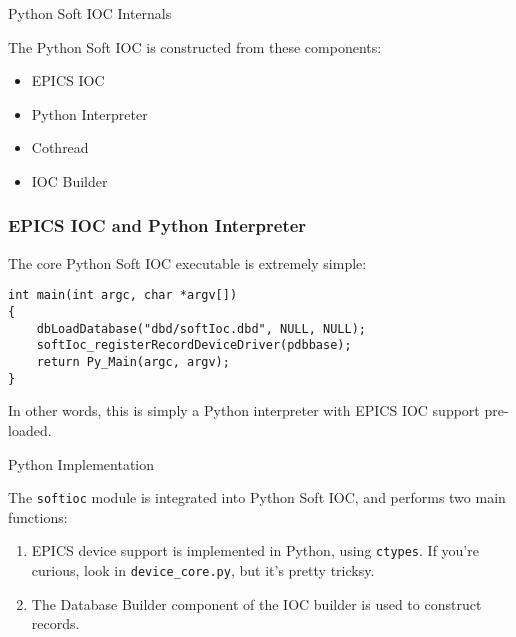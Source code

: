 \documentclass{beamer}
\begin{document}
%
\begin{frame}{Python Soft IOC Internals}

The Python Soft IOC is constructed from these components:

\begin{itemize}
\item EPICS IOC
\item Python Interpreter
\item Cothread
\item IOC Builder
\end{itemize}

\end{frame}


%
\begin{frame}[fragile]\frametitle{EPICS IOC and Python Interpreter}

The core Python Soft IOC executable is extremely simple:

\lstset{language=c}
\begin{lstlisting}
int main(int argc, char *argv[])
{
    dbLoadDatabase("dbd/softIoc.dbd", NULL, NULL);
    softIoc_registerRecordDeviceDriver(pdbbase);
    return Py_Main(argc, argv);
}
\end{lstlisting}

In other words, this is simply a Python interpreter with EPICS IOC support
pre-loaded.

\end{frame}


%
\begin{frame}{Python Implementation}

The \texttt{softioc} module is integrated into Python Soft IOC, and performs two
main functions:

\begin{enumerate}
\item EPICS device support is implemented in Python, using \texttt{ctypes}.  If
you're curious, look in \texttt{device\_core.py}, but it's pretty tricksy.
\item The Database Builder component of the IOC builder is used to
construct records.
\end{enumerate}

\end{frame}
\end{document}
